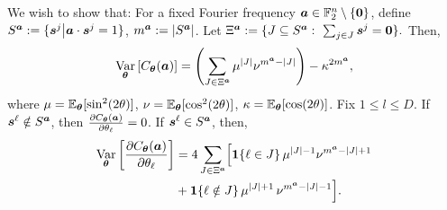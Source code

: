\documentclass{article}
\theoremstyle{plain}
\theoremstyle{definition}
\theoremstyle{remark}
\begin{document}
We wish to show that: For a fixed Fourier frequency ${\bm{a}} \in \mathbb{F}_2^n \setminus \{\mathbf{0}\}$, define $S^{{\bm{a}}} := \{ {\bm{s}^j} \big| {\bm{a}} \cdot {\bm{s}^j} = 1 \}$, $
m^{\bm{a}} := \abs{S^{{\bm{a}}}}$. Let $
\Xi^{\bm{a}}:= \{J\subseteq S^{\bm{a}}:\ \sum_{j\in J}{\bm{s}^j}=\mathbf 0 \}.$ Then, 
\begin{equation*}
     \operatorname*{Var}_{\bm{\theta}} \left[ C_{\bm{\theta}}({\bm{a}}) \right] = 
\left(\sum_{J\in \Xi^{\bm{a}}} \mu^{|J|} \nu^{m^{\bm{a}}-|J|}\right) - \kappa^{2m^{\bm{a}}},
\end{equation*}
where $\mu=\operatorname*{\mathbb{E}}_{{\bm{\theta}}}[\sin^2(2\theta)]$, $\nu=\operatorname*{\mathbb{E}}_{{\bm{\theta}}}[\cos^2(2\theta)]$, $\kappa=\operatorname*{\mathbb{E}}_{{\bm{\theta}}}[\cos(2\theta)]$. Fix $1\leq l \leq D$. If ${\bm{s}^\ell} \notin S^{\bm{a}}$, then $ \frac{\partial C_{\bm{\theta}}({\bm{a}})}{\partial \theta_\ell}=0$. If ${\bm{s}^\ell} \in S^{\bm{a}}$, then, 
\begin{align*}
\operatorname*{Var}_{\bm{\theta}} \left[ \frac{\partial C_{\bm{\theta}}({\bm{a}})}{\partial \theta_\ell} \right]
&= 4\sum_{J\in \Xi^{\bm{a}}}
\Bigl[
\bm{1}\{\ell\in J\}\,\mu^{|J|-1}\nu^{m^{\bm{a}}-|J|+1} \notag
\\&+
\bm{1}\{\ell\notin J\}\,\mu^{|J|+1}\,\nu^{m^{\bm{a}}-|J|-1}\Bigr].
\label{eq: symmetric variance}
\end{align*}
\end{document}
